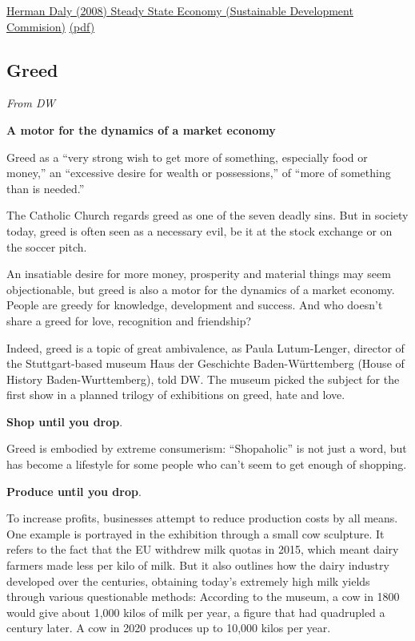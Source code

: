 \documentclass[
]{book}
\begin{document}
\href{http://\%20www.sd-commission.org.uk/publications.php@id=775.html}{Herman Daly (2008) Steady State Economy (Sustainable Development Commision)}
\href{pdf/Daly_2008_Steady_State_Economy_SD_Commision.pdf}{(pdf)}

\hypertarget{greed}{%
\subsection{Greed}\label{greed}}

\emph{From DW}

\textbf{A motor for the dynamics of a market economy}

Greed as a ``very strong wish to get more of something, especially food or money,'' an ``excessive desire for wealth or possessions,'' of ``more of something than is needed.''

The Catholic Church regards greed as one of the seven deadly sins. But in society today, greed is often seen as a necessary evil, be it at the stock exchange or on the soccer pitch.

An insatiable desire for more money, prosperity and material things may seem objectionable, but greed is also a motor for the dynamics of a market economy. People are greedy for knowledge, development and success. And who doesn't share a greed for love, recognition and friendship?

Indeed, greed is a topic of great ambivalence, as Paula Lutum-Lenger, director of the Stuttgart-based museum Haus der Geschichte Baden-Württemberg (House of History Baden-Wurttemberg), told DW.
The museum picked the subject for the first show in a planned trilogy of exhibitions on greed, hate and love.

\textbf{Shop until you drop}.

Greed is embodied by extreme consumerism: ``Shopaholic'' is not just a word,
but has become a lifestyle for some people who can't seem to get enough of shopping.

\textbf{Produce until you drop}.

To increase profits, businesses attempt to reduce production costs by all means.
One example is portrayed in the exhibition through a small cow sculpture. It refers to the fact that the EU withdrew milk quotas in 2015, which meant dairy farmers made less per kilo of milk.
But it also outlines how the dairy industry developed over the centuries, obtaining today's extremely high milk yields through various questionable methods: According to the museum, a cow in 1800 would give about 1,000 kilos of milk per year, a figure that had quadrupled a century later. A cow in 2020 produces up to 10,000 kilos per year.
\end{document}
